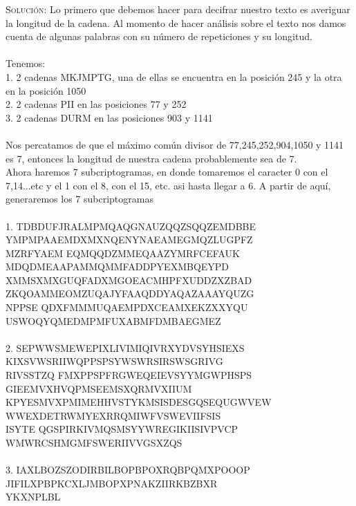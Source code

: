 \documentclass[letterpaper,10pt]{article}
\begin{document}
\begin{enumerate}
\begin{enumerate}
        \textsc{Solución}:
        Lo primero que debemos hacer para decifrar nuestro texto es averiguar la 
longitud de la cadena. Al momento de hacer análisis sobre el texto nos damos 
cuenta de algunas palabras con su número de repeticiones y su longitud.\\\\
Tenemos:\\
1. 2 cadenas MKJMPTG, una de ellas se encuentra en la posición 245 y la otra en 
la posición 1050 \\
2. 2 cadenas PII en las posiciones 77 y 252 \\
3. 2 cadenas DURM en las posiciones 903 y 1141 \\\\
Nos percatamos de que el máximo común divisor de 77,245,252,904,1050 y 1141 es 
7, entonces la longitud de nuestra cadena probablemente sea de 7.\\
Ahora haremos 7 subcriptogramas, en donde tomaremos el caracter 0 con el 
7,14...etc y el 1 con el 8, con el 15, etc. asi hasta llegar a 6. A partir de 
aquí, generaremos los 7 subcriptogramas\\\\
1. 
TDBDUFJRALMPMQAQGNAUZQQZSQQZEMDBBE\\YMPMPAAEMDXMXNQENYNAEAMEGMQZLUGPFZ\\MZRFYAEM
EQMQQDZMMEQAAZYMRFCEFAUK\\MDQDMEAAPAMMQMMFADDPYEXMBQEYPD
\\XMMSXMXGUQFADXMGOEACMHPFXUDDZXZBAD\\ZKQOAMMEOMZUQAJYFAAQDDYAQAZAAAYQUZG\\NPPSE
QDXFMMMUQAEMPDXCEAMXEKZXXYQU\\USWOQYQMEDMPMFUXABMFDMBAEGMEZ\\\\
2. 
SEPWWSMEWEPIXLIVIMIQIVRXYDVSYHSIEXS\\KIXSVWSRIIWQPPSPSYWSWRSIRSWSGRIVG\\RIVSSTZQ
FMXPPSPFRGWEQEIEVSYYMGWPHSPS\\GIEEMVXHVQPMSEEMSXQRMVXIIUM
\\KPYESMVXPMIMEHHVSTYKMSISDESGQSEQUGWVEW\\WWEXDETRWMYEXRRQMIWFVSWEVIIFSIS\\ISYTE
QGSPIRKIVMQSMSYYWREGIKIISIVPVCP\\WMWRCSHMGMFSWERIIVVGSXZQS\\\\
3. 
IAXLBOZSZODIRBILBOPBPOXRQBPQMXPOOOP\\JIFILXPBPKCXLJMBOPXPNAKZIIRKBZBXR\\YKXNPLBL

\end{enumerate}
\end{enumerate}
\end{document}
